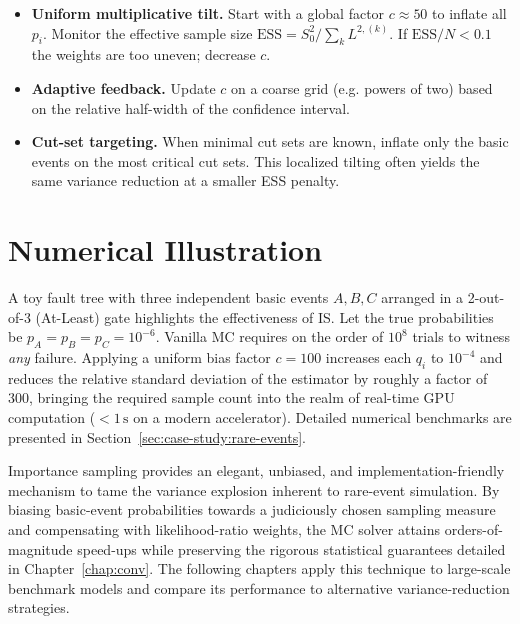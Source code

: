 \begin{itemize}
  \item \textbf{Uniform multiplicative tilt.}  Start with a global
        factor \(c\approx50\) to inflate all \(p_{i}\).  Monitor the effective
        sample size \(\text{ESS}=S_{0}^{2}/\sum_{k}L^{\!2,(k)}\).  If
        \(\text{ESS}/N<0.1\) the weights are too uneven; decrease \(c\).
  \item \textbf{Adaptive feedback.}  Update \(c\) on a coarse grid (e.g.
        powers of two) based on the relative half-width of the confidence
        interval.
  \item \textbf{Cut-set targeting.}  When minimal cut sets are known, inflate
        only the basic events on the most critical cut sets.  This localized
        tilting often yields the same variance reduction at a smaller ESS
        penalty.
\end{itemize}

\section{Numerical Illustration}
\label{sec:is:example}

A toy fault tree with three independent basic events \(A,B,C\) arranged in a
2-out-of-3 (At-Least) gate highlights the effectiveness of IS.  Let the true
probabilities be \(p_{A}=p_{B}=p_{C}=10^{-6}\).  Vanilla MC requires on the
order of \(10^{8}\) trials to witness \emph{any} failure.  Applying a uniform
bias factor \(c=100\) increases each \(q_{i}\) to \(10^{-4}\) and reduces the
relative standard deviation of the estimator by roughly a factor of 300,
bringing the required sample count into the realm of real-time GPU
computation (\(<1\,\text{s}\) on a modern accelerator).  Detailed numerical
benchmarks are presented in Section~\ref{sec:case-study:rare-events}.


Importance sampling provides an elegant, unbiased, and implementation-friendly
mechanism to tame the variance explosion inherent to rare-event simulation.
By biasing basic-event probabilities towards a judiciously chosen sampling
measure and compensating with likelihood-ratio weights, the MC solver attains
orders-of-magnitude speed-ups while preserving the rigorous statistical
guarantees detailed in Chapter~\ref{chap:conv}.  The following chapters apply
this technique to large-scale benchmark models and compare its performance to
alternative variance-reduction strategies.
